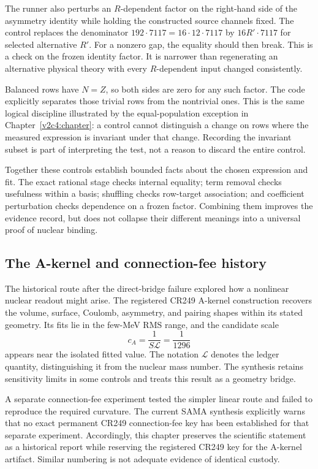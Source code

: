 The runner also perturbs an $R$-dependent factor on the right-hand side of the asymmetry identity while holding the constructed source channels fixed. The control replaces the denominator $192\cdot7117=16\cdot12\cdot7117$ by $16R'\cdot7117$ for selected alternative $R'$. For a nonzero gap, the equality should then break. This is a check on the frozen identity factor. It is narrower than regenerating an alternative physical theory with every $R$-dependent input changed consistently.

Balanced rows have $N=Z$, so both sides are zero for any such factor. The code explicitly separates those trivial rows from the nontrivial ones. This is the same logical discipline illustrated by the equal-population exception in Chapter~\ref{v2c4:chapter}: a control cannot distinguish a change on rows where the measured expression is invariant under that change. Recording the invariant subset is part of interpreting the test, not a reason to discard the entire control.

Together these controls establish bounded facts about the chosen expression and fit. The exact rational stage checks internal equality; term removal checks usefulness within a basis; shuffling checks row-target association; and coefficient perturbation checks dependence on a frozen factor. Combining them improves the evidence record, but does not collapse their different meanings into a universal proof of nuclear binding.

\subsection{The A-kernel and connection-fee history}
\label{v2c5:history}

The historical route after the direct-bridge failure explored how a nonlinear nuclear readout might arise. The registered CR249 A-kernel construction recovers the volume, surface, Coulomb, asymmetry, and pairing shapes within its stated geometry. Its fits lie in the few-MeV RMS range, and the candidate scale
\begin{equation}
 c_A=\frac{1}{S\mathcal L}=\frac{1}{1296}
 \label{v2c5:akernelscale}
\end{equation}
appears near the isolated fitted value. The notation $\mathcal L$ denotes the ledger quantity, distinguishing it from the nuclear mass number. The synthesis retains sensitivity limits in some controls and treats this result as a geometry bridge.\cite{viispine,viisama}

A separate connection-fee experiment tested the simpler linear route and failed to reproduce the required curvature. The current SAMA synthesis explicitly warns that no exact permanent CR249 connection-fee key has been established for that separate experiment. Accordingly, this chapter preserves the scientific statement as a historical report while reserving the registered CR249 key for the A-kernel artifact. Similar numbering is not adequate evidence of identical custody.

